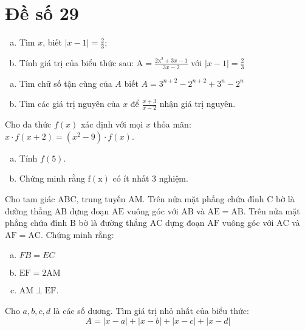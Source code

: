 \onehalfspacing
\section{Đề số 29}

\begin{bt} 
   \hfill
   \begin{enumerate}[a.]
    \item  Tìm $x$, biết $|x-1|=\frac{2}{3}$;
    \item Tính giá trị của biểu thức sau: $\mathrm{A}=\frac{2 \mathrm{x}^2+3 x-1}{3 x-2}$ với $|x-1|=\frac{2}{3}$
   \end{enumerate}
\loigiai{}
\end{bt}

\begin{bt}
    \hfill
	\begin{enumerate}[a.]
        \item Tìm chữ số tận cùng của $A$ biết $A=3^{n+2}-2^{n+2}+3^n-2^n$
        \item Tìm các giá trị nguyên của $x$ để $\frac{x+3}{x-2}$ nhận giá trị nguyên.
    \end{enumerate}
	\loigiai{} 
\end{bt}

\begin{bt}
    Cho đa thức $f(x)$ xác định với mọi $x$ thỏa mãn: $x \cdot f(x+2)=\left(x^2-9\right) \cdot f(x)$.
    \begin{enumerate}[a.]
        \item Tính $f(5)$.
        \item Chứng minh rằng $\mathrm{f}(\mathrm{x})$ có ít nhất 3 nghiệm.
    \end{enumerate}
	\loigiai{}
\end{bt}

\begin{bt}
    Cho tam giác $\mathrm{ABC}$, trung tuyến $\mathrm{AM}$. Trên nửa mặt phẳng chứa đỉnh $\mathrm{C}$ bờ là đường thẳng $\mathrm{AB}$ dựng đoạn $\mathrm{AE}$ vuông góc với $\mathrm{AB}$ và $\mathrm{AE}=\mathrm{AB}$. Trên nửa mặt phẳng chứa đỉnh $\mathrm{B}$ bờ là đường thẳng $\mathrm{AC}$ dựng đoạn $\mathrm{AF}$ vuông góc với $\mathrm{AC}$ và $\mathrm{AF}=\mathrm{AC}$. Chứng minh rằng:
    \begin{enumerate}[a.]
        \item $F B=E C$
        \item $\mathrm{EF}=2 \mathrm{AM}$
        \item $\mathrm{AM} \perp \mathrm{EF}$.
    \end{enumerate}
	\loigiai{}
\end{bt}

\begin{bt}
    Cho $a, b, c, d$ là các số dương. Tìm giá trị nhỏ nhất của biểu thức:
$$
A=|x-a|+|x-b|+|x-c|+|x-d|
$$
\loigiai{}
\end{bt}


